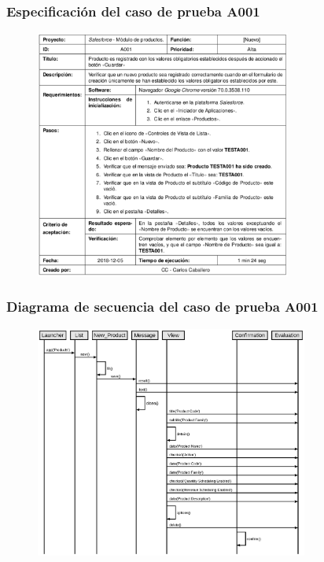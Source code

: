 \documentclass{beamer}
\begin{document}
\begin{frame}
\frametitle{Especificación del caso de prueba A001}
\begin{figure}
\centering
\includegraphics[width=0.75\textwidth]{graphics/figure3.eps}
\end{figure}
\end{frame}

\begin{frame}
\frametitle{Diagrama de secuencia del caso de prueba A001}
\begin{figure}
\centering
\includegraphics[width=0.8\textwidth]{graphics/diagram02.eps}
\end{figure}
\end{frame}
\end{document}
